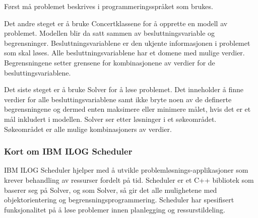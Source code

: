 Først må problemet beskrives i programmeringsspråket som brukes.

Det andre steget er å bruke Concertklassene for å opprette en modell av problemet. Modellen blir da satt sammen av besluttningsvariable og begrensninger. Besluttningsvariablene er den ukjente informasjonen i problemet som skal løses. Alle besluttningsvariablene har et domene med mulige verdier. Begrensningene setter grensene for kombinasjonene av verdier for de besluttingsvariablene.

Det siste steget er å bruke Solver for å løse problemet. Det inneholder å finne verdier for alle besluttingsvariablene samt ikke bryte noen av de definerte begrensningene og dermed enten maksimere eller minimere målet, hvis det er et mål inkludert i modellen. Solver ser etter løsninger i et søkeområdet. Søkeområdet er alle mulige kombinasjoners av verdier.\cite{cpsolverilog}

\subsubsection{Kort om IBM ILOG Scheduler}
IBM ILOG Scheduler hjelper med å utvikle problemløsnings-applikasjoner som krever behandling av ressurser fordelt på tid. Scheduler er et C++ bibliotek som baserer seg på Solver, og som Solver, så gir det alle mulighetene med objektorientering og begrensningsprogrammering. Scheduler har spesifisert funksjonalitet på å løse problemer innen planlegging og ressurstildeling.\cite{cpschedulerilog}